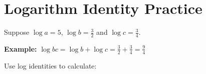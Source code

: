 \section*{Logarithm Identity Practice}

\begin{questions}

\question

Suppose $\log a=5$, $\log b=\frac{3}{2}$ and $\log c=\frac{3}{4}$. 

\textbf{Example:} $\log bc = \log b + \log c = \frac{3}{2} + \frac{3}{4}= \frac{9}{4}$

Use log identities to calculate:

\end{questions}
